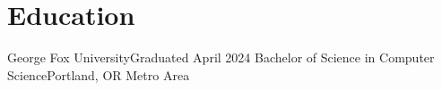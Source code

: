 \section{Education}
  \resumeSubHeadingListStart
    \resumeEducationSubheading
        {George Fox University}{Graduated April 2024}
        {Bachelor of Science in Computer Science}{Portland, OR Metro Area}
  \resumeSubHeadingListEnd



